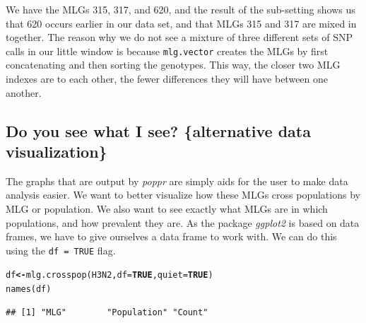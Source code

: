 \documentclass[letterpaper]{article}\usepackage[]{graphicx}\usepackage[]{color}
\makeatletter
\newcommand{\hlnum}[1]{\textcolor[rgb]{0.502,0,0.502}{\textbf{#1}}}%
\newcommand{\hlstd}[1]{\textcolor[rgb]{0,0,0}{#1}}%
\newcommand{\hlkwb}[1]{\textcolor[rgb]{0.502,0.502,0.753}{\textbf{#1}}}%
\newcommand{\hlkwc}[1]{\textcolor[rgb]{0,0.502,0.753}{#1}}%
\newcommand{\hlkwd}[1]{\textcolor[rgb]{0,0.267,0.4}{#1}}%
\newenvironment{kframe}{%
 \def\at@end@of@kframe{}%
 \ifinner\ifhmode%
  \def\at@end@of@kframe{\end{minipage}}%
  \begin{minipage}{\columnwidth}%
 \fi\fi%
 \def\FrameCommand##1{\hskip\@totalleftmargin \hskip-\fboxsep
 \colorbox{shadecolor}{##1}\hskip-\fboxsep
     \hskip-\linewidth \hskip-\@totalleftmargin \hskip\columnwidth}%
 \MakeFramed {\advance\hsize-\width
   \@totalleftmargin\z@ \linewidth\hsize
   \@setminipage}}%
 {\par\unskip\endMakeFramed%
 \at@end@of@kframe}
\newenvironment{knitrout}{}{} %
\newcommand{\tab}{\hspace*{1em}}
\makeatother
\begin{document}
We have the MLGs 315, 317, and 620, and the result of the sub-setting shows us that 620 occurs earlier in our data set, and that MLGs 315 and 317 are mixed in together. The reason why we do not see a mixture of three different sets of SNP calls in our little window is because \texttt{mlg.vector} creates the MLGs by first concatenating and then sorting the genotypes. This way, the closer two MLG indexes are to each other, the fewer differences they will have between one another. 
\subsection{Do you see what I see? \{alternative data visualization\}}\label{mlg:alt.vis}

\tab\tab The graphs that are output by \textit{poppr} are simply aids for the user to make data analysis easier. We want to better visualize how these MLGs cross populations by MLG or population. We also want to see exactly what MLGs are in which populations, and how prevalent they are. As the package \textit{ggplot2} is based on data frames, we have to give ourselves a data frame to work with. We can do this using the \texttt{df = TRUE} flag.
\begin{knitrout}\footnotesize
{}\color{fgcolor}\begin{kframe}
\begin{alltt}
\hlstd{df} \hlkwb{<-} \hlkwd{mlg.crosspop}\hlstd{(H3N2,} \hlkwc{df} \hlstd{=} \hlnum{TRUE}\hlstd{,} \hlkwc{quiet} \hlstd{=} \hlnum{TRUE}\hlstd{)}
\hlkwd{names}\hlstd{(df)}
\end{alltt}
\begin{verbatim}
## [1] "MLG"        "Population" "Count"
\end{verbatim}
\end{kframe}
\end{knitrout}
\end{document}
